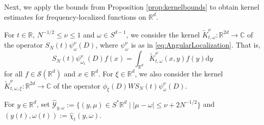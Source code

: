 \documentclass{amsart}
\numberwithin{equation}{section}
\theoremstyle{definition}
\newcommand{\R}{\mathbb{R}}
\newcommand{\Rd}{\mathbb{R}^{d}}
\newcommand{\C}{\mathbb{C}}
\newcommand {\ud}{\mathrm{d}}
\newcommand {\Sp}{S^{*}\Rd}
\newcommand {\Sw}{\mathcal{S}}
\newcommand {\w}{\omega}
\begin{document}
Next, we apply the bounds from Proposition \ref{prop:kernelbounds} to obtain kernel estimates for frequency-localized functions on $\Rd$.

For $t\in\R$, $N^{-1/2}\leq \nu\leq 1$ and $\w\in S^{d-1}$, we consider the kernel $\tilde{K}^{\nu}_{t,\w}:\R^{2d}\to\C$ of the operator $S_N(t) \psi^{\nu}_{\omega}(D)$, where $\psi^{\nu}_{\w}$ is as in \eqref{eq:AngularLocalization}. That is, 
\begin{equation*}
S_N(t) \psi^{\nu}_{\omega_1}(D) f(x) = \int_{\Rd} \tilde{K}_{t,\w}^{\nu}(x,y) f(y) \ud y
\end{equation*}
for all $f\in\Sw(\Rd)$ and $x\in\Rd$. %
For $\xi\in\Rd$, we also consider the kernel $\tilde{K}^{\nu}_{t,\w,\xi}:\R^{2d}\to\C$ of the operator $\phi_{\xi}(D)WS_{N}(t)\psi^{\nu}_{\w}(D)$. 

For $y\in\Rd$, set $\hat{\mathcal{Y}}_{y,\omega} := \{ (y,\mu)\in\Sp \mid  |\mu- \w| \leq \nu + 2 N^{-1/2} \} $ and $(y(t),\omega(t)) := \hat{\chi}_{t} (y,\omega)$.
\end{document}
